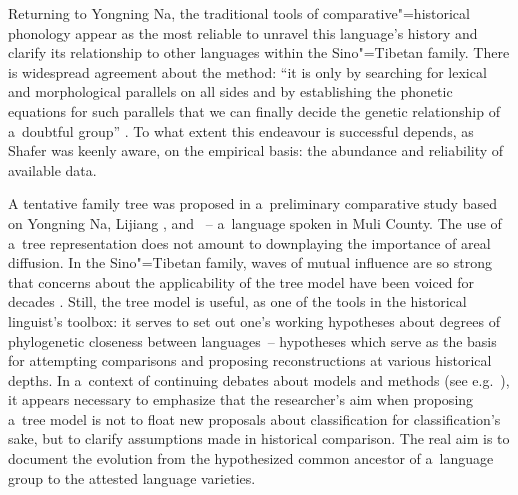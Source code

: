Returning to Yongning Na, the traditional tools of comparative"=historical phonology appear as the most reliable to unravel this language’s history and clarify its relationship to other languages within the Sino"=Tibetan family. There is widespread agreement about the method: “it is only by searching for lexical and morphological parallels on all sides and by establishing the phonetic equations for such parallels that we can finally decide the genetic relationship of a~doubtful group” \citep[98]{Shafer1955}. To what extent this endeavour is successful depends, as Shafer was keenly aware, on the empirical basis: the abundance and reliability of available data.

A tentative family tree was proposed in a~preliminary comparative study \citep{jacquesetal2011} based on Yongning Na, Lijiang , and ~-- a~language spoken in Muli County. The use of a~tree representation does not amount to downplaying the importance of areal diffusion. In the Sino"=Tibetan family, waves of mutual influence are so strong that concerns about the applicability of the tree model have been voiced for decades \citep{benedict1972,matisoff1978}. Still, the tree model is useful, as one of the tools in the historical linguist’s toolbox: it serves to set out one’s working hypotheses about degrees of phylogenetic closeness between languages~-- hypotheses which serve as the basis for attempting comparisons and proposing reconstructions at various historical depths. In a~context of continuing debates about models and methods (see e.g.~\citealt{francois2014, jacques.listSAVE}), it appears necessary to emphasize that the researcher’s aim when proposing a~tree model is not to {float} new proposals about classification for classification’s sake, but to clarify assumptions made in historical comparison. The real aim is to document the evolution from the hypothesized common ancestor of a~language group to the attested language varieties.

